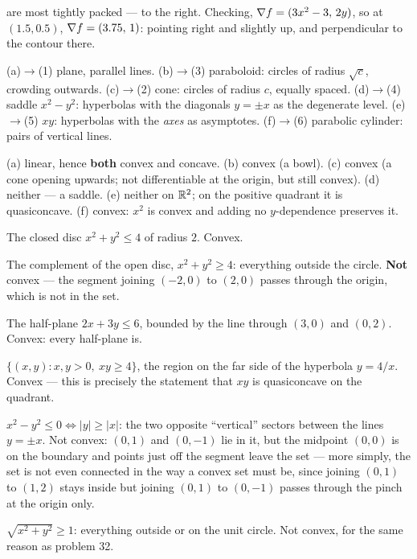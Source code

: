 \begin{solutions}
        are most tightly packed --- to the right. Checking,
        $\nabla f=(3x^{2}-3,\,2y)$, so at $(1.5,0.5)$,
        $\nabla f=(3.75,\,1)$: pointing right and slightly up, and
        perpendicular to the contour there.
  \item (a)$\to$(1) plane, parallel lines. \;(b)$\to$(3) paraboloid:
        circles of radius $\sqrt{c}$, crowding outwards.
        \;(c)$\to$(2) cone: circles of radius $c$, equally spaced.
        \;(d)$\to$(4) saddle $x^{2}-y^{2}$: hyperbolas with the diagonals
        $y=\pm x$ as the degenerate level. \;(e)$\to$(5) $xy$: hyperbolas
        with the \emph{axes} as asymptotes. \;(f)$\to$(6) parabolic
        cylinder: pairs of vertical lines.
  \item (a) linear, hence \textbf{both} convex and concave. (b) convex (a
        bowl). (c) convex (a cone opening upwards; not differentiable at
        the origin, but still convex). (d) neither --- a saddle.
        (e) neither on $\mathbb{R}^{2}$; on the positive quadrant it is
        quasiconcave. (f) convex: $x^{2}$ is convex and adding no
        $y$-dependence preserves it.
  \item The closed disc $x^{2}+y^{2}\le4$ of radius $2$. Convex.
  \item The complement of the open disc, $x^{2}+y^{2}\ge4$: everything
        outside the circle. \textbf{Not} convex --- the segment joining
        $(-2,0)$ to $(2,0)$ passes through the origin, which is not in the
        set.
  \item The half-plane $2x+3y\le6$, bounded by the line through $(3,0)$ and
        $(0,2)$. Convex: every half-plane is.
  \item $\{(x,y): x,y>0,\ xy\ge4\}$, the region on the far side of the
        hyperbola $y=4/x$. Convex --- this is precisely the statement that
        $xy$ is quasiconcave on the quadrant.
  \item $x^{2}-y^{2}\le0\iff|y|\ge|x|$: the two opposite ``vertical'' sectors
        between the lines $y=\pm x$. Not convex: $(0,1)$ and $(0,-1)$ lie
        in it, but the midpoint $(0,0)$ is on the boundary and points just
        off the segment leave the set --- more simply, the set is not even
        connected in the way a convex set must be, since joining
        $(0,1)$ to $(1,2)$ stays inside but joining $(0,1)$ to $(0,-1)$
        passes through the pinch at the origin only.
  \item $\sqrt{x^{2}+y^{2}}\ge1$: everything outside or on the unit circle.
        Not convex, for the same reason as problem 32.

\end{solutions}
